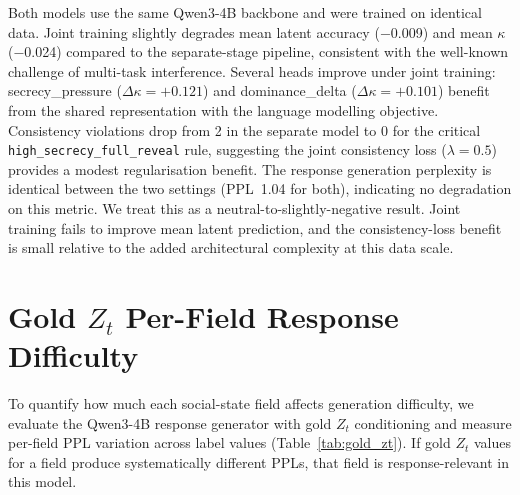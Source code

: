 \documentclass[11pt]{article}
\begin{document}
Both models use the same Qwen3-4B backbone and were trained on identical data.
Joint training slightly degrades mean latent accuracy ($-$0.009) and mean $\kappa$ ($-$0.024) compared to the separate-stage pipeline, consistent with the well-known challenge of multi-task interference.
Several heads improve under joint training: secrecy\_pressure ($\Delta\kappa{=}+0.121$) and dominance\_delta ($\Delta\kappa{=}+0.101$) benefit from the shared representation with the language modelling objective.
Consistency violations drop from 2 in the separate model to 0 for the critical \texttt{high\_secrecy\_full\_reveal} rule, suggesting the joint consistency loss ($\lambda{=}0.5$) provides a modest regularisation benefit.
The response generation perplexity is identical between the two settings (PPL~1.04 for both), indicating no degradation on this metric.
We treat this as a neutral-to-slightly-negative result. Joint training fails to improve mean latent prediction, and the consistency-loss benefit is small relative to the added architectural complexity at this data scale.

\section{Gold $Z_t$ Per-Field Response Difficulty}
\label{app:gold_zt_bridge}

To quantify how much each social-state field affects generation difficulty, we evaluate the Qwen3-4B response generator with gold $Z_t$ conditioning and measure per-field PPL variation across label values (Table~\ref{tab:gold_zt}).
If gold $Z_t$ values for a field produce systematically different PPLs, that field is response-relevant in this model.

\begin{table}[tp]
\centering
\caption{Gold $Z_t$ per-field response PPL variation ($n=500$ examples). Effect size is Cohen's $d$ across label values.}
\label{tab:gold_zt}
\footnotesize
{}
\end{table}
\end{document}
